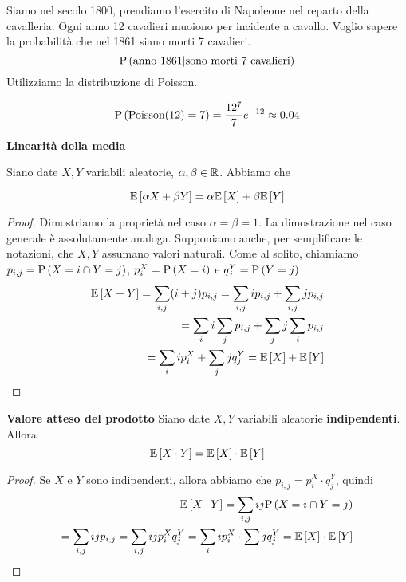 \begin{exmp}
	Siamo nel secolo 1800, prendiamo l'esercito di Napoleone nel reparto della cavalleria. Ogni anno 12 cavalieri muoiono per incidente a cavallo. Voglio sapere la probabilit\`a  che nel 1861 siano morti 7 cavalieri.
    \begin{equation*}
    \text{P}\left(\text{anno } 1861 | \text{sono morti 7 cavalieri}\right)
    \end{equation*}
    Utilizziamo la distribuzione di Poisson.
    
    \begin{equation*}
    \text{P}\left(\text{Poisson}(12) = 7\right) = \dfrac{12^7}{7}e^{-12} \approx 0.04
    \end{equation*}
    
\end{exmp}

\begin{prop}
	\textbf{Linearit\`a  della media}
    
    Siano date $ X,Y $ variabili aleatorie, $ \alpha ,\beta \in \mathbb{R} $. Abbiamo che
    
    \begin{equation*}
    \mathbb{E}\left[\alpha X + \beta Y\right] = \alpha \mathbb{E}\left[X\right] + \beta \mathbb{E}\left[Y\right]
    \end{equation*}
\end{prop}


\begin{proof} Dimostriamo la propriet\`a nel caso $\alpha=\beta=1$. La dimostrazione
    nel caso generale \`e assolutamente analoga. 
    Supponiamo anche, per semplificare le notazioni, che $X,Y$ assumano valori naturali.
    Come al solito, chiamiamo $p_{i,j}=\text{P}\left(X=i\cap Y=j\right)$, $p_i^X=\text{P}\left(X=i\right)$ e $q_j^Y=\text{P}\left(Y=j\right)$
            \begin{equation*}
            \begin{aligned}
            \mathbb{E}\left[X+Y\right] = \sum_{i,j} (i+j)p_{i,j} = \sum_{i,j} ip_{i,j} + \sum_{i,j} jp_{i,j} \\
            = \sum_i i \sum_j p_{i,j} + \sum_j j \sum_i p_{i,j} \\
            = \sum_i i p_i^X + \sum_j jq_j^Y = \mathbb{E}\left[X\right] + \mathbb{E}\left[Y\right]
            \end{aligned}
            \end{equation*}
\end{proof}

\begin{prop}
	\textbf{Valore atteso del prodotto}
	Siano date $ X,Y $ variabili aleatorie \textbf{indipendenti}. Allora
	$$\mathbb{E}\left[X \cdot Y\right] = \mathbb{E}\left[X\right] \cdot \mathbb{E}\left[Y\right]
	$$
\end{prop}
\begin{proof}
    Se $X$ e $Y$ sono indipendenti, allora abbiamo che $p_{i,j}= p_i^X\cdot q_j^Y$, quindi
        \begin{equation*}
        \begin{aligned}
        \mathbb{E}\left[X \cdot Y\right] = \sum_{i,j} i  j  \text{P}\left(X = i \cap Y =j\right) \\
        = \sum_{i,j} i  j p_{i,j} = \sum_{i,j} ij p_i^X q_j^Y =  \sum_{i} i p_i^X \cdot \sum j q_j^Y
        = \mathbb{E}\left[X\right] \cdot \mathbb{E}\left[Y\right]
        \end{aligned}
        \end{equation*}
\end{proof}


